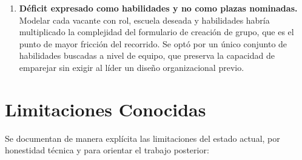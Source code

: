 \documentclass[12pt,a4paper]{article}
\begin{document}
\begin{enumerate}
    \item \textbf{Déficit expresado como habilidades y no como plazas nominadas.} Modelar cada vacante con rol, escuela deseada y habilidades habría multiplicado la complejidad del formulario de creación de grupo, que es el punto de mayor fricción del recorrido. Se optó por un único conjunto de habilidades buscadas a nivel de equipo, que preserva la capacidad de emparejar sin exigir al líder un diseño organizacional previo.
\end{enumerate}

\newpage
\section{Limitaciones Conocidas}
\label{sec:limitaciones}

Se documentan de manera explícita las limitaciones del estado actual, por honestidad técnica y para orientar el trabajo posterior:
\end{document}
